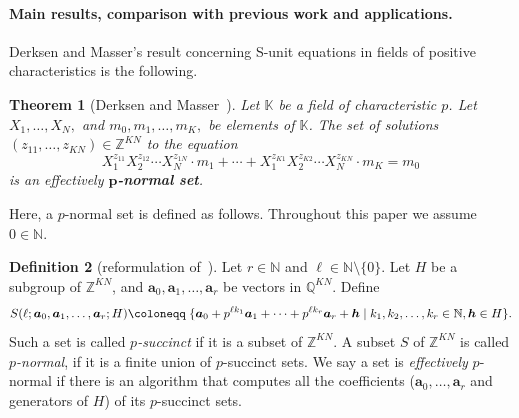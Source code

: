 \documentclass[letterpaper, 11pt, thm-restate]{article}
\numberwithin{equation}{section}
\newcommand{\Z}{\mathbb{Z}}
\newcommand{\N}{\mathbb{N}}
\newcommand{\Q}{\mathbb{Q}}
\newcommand{\K}{\mathbb{K}}
\newcommand{\ba}{\boldsymbol{a}}
\newcommand{\bc}{\boldsymbol{c}}
\newcommand{\bh}{\boldsymbol{h}}
\newcommand{\red}{\textcolor{red}}
\newtheorem{thrm}{Theorem}[section]
\theoremstyle{definition}
\newtheorem{defn}[thrm]{Definition}
\theoremstyle{definition}
\theoremstyle{definition}
\begin{document}
\paragraph*{Main results, comparison with previous work and applications.}

Derksen and Masser's result concerning S-unit equations in fields of positive characteristics is the following.


\begin{thrm}[{Derksen and Masser~\cite{derksen2012linear}}]\label{thm:DM}
    Let $\K$ be a field of characteristic $p$. Let $X_1, \ldots, X_N,$ and $m_0, m_1, \ldots, m_K,$ be elements of $\K$.
    The set of solutions $(z_{11}, \ldots, z_{KN}) \in \Z^{KN}$ to the equation
    \[
        X_1^{z_{11}} X_2^{z_{12}} \cdots X_N^{z_{1N}} \cdot m_1 + \cdots + X_1^{z_{K1}} X_2^{z_{K2}} \cdots X_N^{z_{KN}} \cdot m_K = m_0
    \]
    is an effectively \textbf{$\boldsymbol{p}$-normal set}.
\end{thrm}

Here, a $p$-normal set is defined as follows. Throughout this paper we assume $0 \in \N$.

\begin{defn}[{reformulation of~\cite{derksen2015linear}}]\label{def:pnormal}
    Let $r \in \N$ and $\ell \in \N \setminus \{0\}$.
    Let $H$ be a subgroup of $\Z^{KN}$, and $\ba_0, \ba_1, \ldots, \ba_r$ be vectors in $\Q^{KN}$.
    Define
    \begin{equation}\label{eq:psuccinct}
    S(\ell; \ba_0, \ba_1, \ldots, \ba_r; H) \\
        \coloneqq \; \{\ba_0 + p^{\ell k_1} \ba_1 + \cdots + p^{\ell k_r} \ba_r + \bh \mid k_1, k_2, \ldots, k_r \in \N, \bh \in H\}.
    \end{equation}
    Such a set is called \emph{$p$-succinct} if it is a subset of $\Z^{KN}$.
    A subset $S$ of $\Z^{KN}$ is called \emph{$p$-normal}, if it is a finite union of $p$-succinct sets. %
    We say a set is \emph{effectively} $p$-normal if there is an algorithm that computes all the coefficients ($\ba_0, \ldots, \ba_r$ and generators of $H$) of its $p$-succinct sets.
\end{defn}
\end{document}
